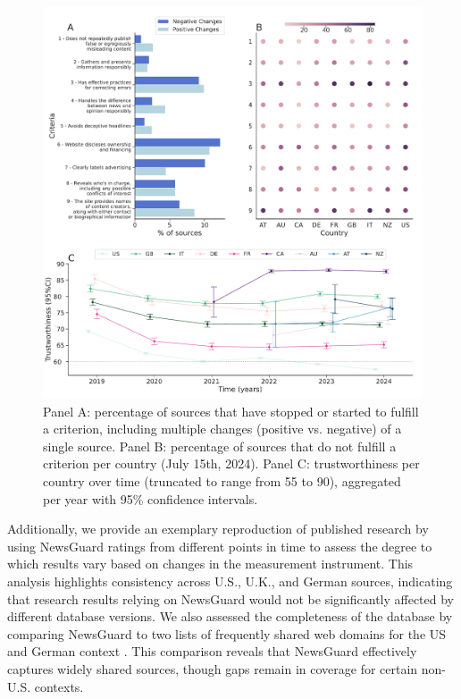 \documentclass{article}
\begin{document}
\begin{figure}[H]
    \centering
    \includegraphics[width=\textwidth]{figures/criteria_panel_cropped.pdf}
    \caption{Panel A: percentage of sources that have stopped or started to fulfill a criterion, including multiple changes (positive vs. negative) of a single source. Panel B: percentage of sources that do not fulfill a criterion per country (July 15th, 2024). Panel C: trustworthiness per country over time (truncated to range from 55 to 90), aggregated per year with 95\% confidence intervals.}
    \label{fig:criteria_panel}
\end{figure}

Additionally, we provide an exemplary reproduction of published research by \cite{lasserSocialMediaSharing2022c} using NewsGuard ratings from different points in time to assess the degree to which results vary based on changes in the measurement instrument.
This analysis highlights consistency across U.S., U.K., and German sources, indicating that research results relying on NewsGuard would not be significantly affected by different database versions. 
We also assessed the completeness of the database by comparing NewsGuard to two lists of frequently shared web domains for the US \citep{linHighLevelCorrespondence2023a} and German context \citep{puschmannGermanOnlineNews2023}.
This comparison reveals that NewsGuard effectively captures widely shared sources, though gaps remain in coverage for certain non-U.S. contexts.
\end{document}
